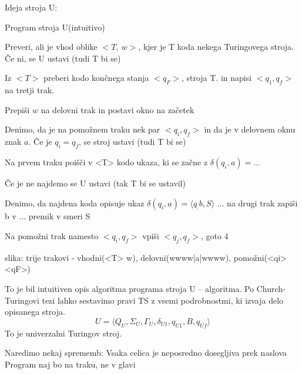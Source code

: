 \documentclass[10pt,a4paper,oneside]{book}
\begin{document}
\begin{neurejeno}
Ideja stroja U:


Program stroja U(intuitivo)
\begin{items}
\item Preveri, ali je vhod oblike $<T,\ w>$, kjer je T koda nekega Turingovega stroja. Če ni, se U ustavi (tudi T bi se)
\item Iz $<T>$ preberi kodo končnega stanja $<q_F>$, stroja T. in napisi $<q_1, q_f>$ na tretji trak.
\item Prepiši $w$ na delovni trak in postavi okno na začetek 
\item Denimo, da je na pomožnem traku nek par $<q_i, q_f>$ in da je v delovnem oknu znak $a$. Če je $q_i=q_f$, se stroj ustavi (tudi T bi se)
\item Na prvem traku poišči v <T> kodo ukaza, ki se začne z $\delta(q_i, a)=\dots$
\item Če je ne najdemo se U ustavi (tak T bi se ustavil)
\item Denimo, da najdena koda opisuje ukaz $\delta(q_i, a)=\langle q_, b, S \rangle$ ... na drugi trak zapiši b v ... premik v smeri S
\item Na pomožni trak namesto $<q_i,q_f>$ vpiši $<q_j,q_f>$, goto 4
\end{items}
\fixme slika: trije trakovi - vhodni(<T> w), delovni(wwww|a|wwww), pomožni(<qi><qF>)

To je bil intuitiven opis algoritma programa stroja U -- algoritma. Po Church-Turingovi tezi lahko sestavimo pravi TS z vsemi podrobnostmi, ki izvaja delo opisanega stroja.
\[U=\langle Q_U,\Sigma_U,\Gamma_U,\delta_{U1},q_{U1},B,q_{Uf} \rangle  \]
To je univerzalni Turingov stroj.

Naredimo nekaj sprememb:
Vsaka celica je neposredno dosegljiva prek naslova
Program naj bo na traku, ne v glavi
\end{neurejeno}
\end{document}
